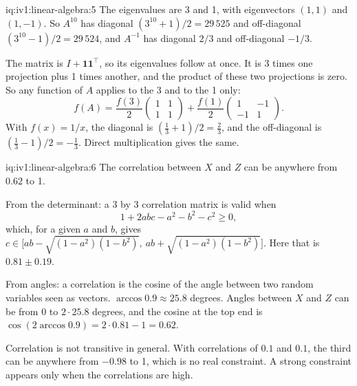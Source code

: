 \begin{solution}{iq:iv1:linear-algebra:5}
The eigenvalues are 3 and 1, with eigenvectors $(1, 1)$ and $(1, -1)$. So $A^{10}$ has diagonal $(3^{10} + 1)/2 = 29\,525$ and off-diagonal $(3^{10} - 1)/2 = 29\,524$, and $A^{-1}$ has diagonal $2/3$ and off-diagonal $-1/3$.

The matrix is $I + \mathbf{1}\mathbf{1}^\top$, so its eigenvalues follow at once. It is 3 times one projection plus 1 times another, and the product of these two projections is zero. So any function of $A$ applies to the 3 and to the 1 only:
\[
f(A) = \frac{f(3)}{2}\begin{pmatrix}1&1\\1&1\end{pmatrix} + \frac{f(1)}{2}\begin{pmatrix}1&-1\\-1&1\end{pmatrix}.
\]
With $f(x) = 1/x$, the diagonal is $(\tfrac13 + 1)/2 = \tfrac23$, and the off-diagonal is $(\tfrac13 - 1)/2 = -\tfrac13$. Direct multiplication gives the same.

\end{solution}

\begin{solution}{iq:iv1:linear-algebra:6}
The correlation between $X$ and $Z$ can be anywhere from $0.62$ to 1.

From the determinant: a 3 by 3 correlation matrix is valid when
\[
1 + 2abc - a^2 - b^2 - c^2 \ge 0,
\]
which, for a given $a$ and $b$, gives $c \in \bigl[ab - \sqrt{(1 - a^2)(1 - b^2)},\ ab + \sqrt{(1 - a^2)(1 - b^2)}\bigr]$. Here that is $0.81 \pm 0.19$.

From angles: a correlation is the cosine of the angle between two random variables seen as vectors. $\arccos 0.9 \approx 25.8$ degrees. Angles between $X$ and $Z$ can be from 0 to $2 \cdot 25.8$ degrees, and the cosine at the top end is $\cos(2\arccos 0.9) = 2 \cdot 0.81 - 1 = 0.62$.

Correlation is not transitive in general. With correlations of $0.1$ and $0.1$, the third can be anywhere from $-0.98$ to 1, which is no real constraint. A strong constraint appears only when the correlations are high.

\end{solution}

